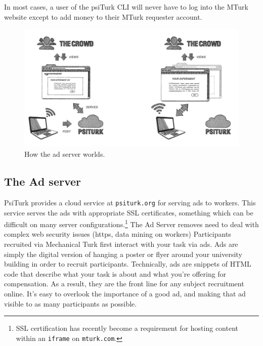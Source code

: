 \documentclass[twocolumn]{svjour3}          %
\begin{document}
In most cases, a user of the
psiTurk CLI will never have to log into the MTurk website except to add money to their MTurk
requester account.


\begin{figure}[tp]
\centering
\includegraphics[scale=.40]{figures/psiturk_cloud_sequence.jpg}
\caption{How the ad server worlds.}
\label{fig:adserver}
\end{figure}


\subsection{The Ad server}

PsiTurk provides a cloud service at \texttt{psiturk.org} for serving ads to workers.
This service serves the ads with appropriate SSL certificates, something which can be difficult on many server configurations.\footnote{SSL certification has recently become a requirement for hosting content within an \texttt{iframe} on \texttt{mturk.com}.}
The Ad Server removes need to deal with complex web security issues (https, data mining on workers) 
Participants recruited via Mechanical Turk first interact with your task via ads. Ads are simply the digital version of hanging a poster or flyer around your university building in order to recruit participants. Technically, ads are snippets of HTML code that describe what your task is about and what you're offering for compensation. As a result, they are the front line for any subject recruitment online. It's easy to overlook the importance of a good ad, and making that ad visible to as many participants as possible.


\end{document}
